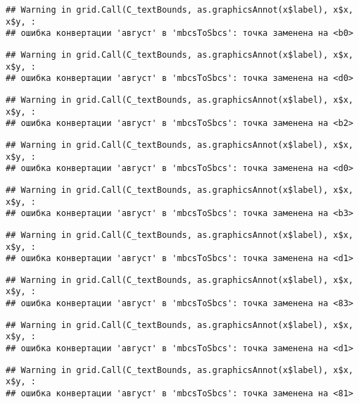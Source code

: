 \documentclass[
]{article}
\begin{document}
\begin{verbatim}
## Warning in grid.Call(C_textBounds, as.graphicsAnnot(x$label), x$x, x$y, :
## ошибка конвертации 'август' в 'mbcsToSbcs': точка заменена на <b0>
\end{verbatim}

\begin{verbatim}
## Warning in grid.Call(C_textBounds, as.graphicsAnnot(x$label), x$x, x$y, :
## ошибка конвертации 'август' в 'mbcsToSbcs': точка заменена на <d0>
\end{verbatim}

\begin{verbatim}
## Warning in grid.Call(C_textBounds, as.graphicsAnnot(x$label), x$x, x$y, :
## ошибка конвертации 'август' в 'mbcsToSbcs': точка заменена на <b2>
\end{verbatim}

\begin{verbatim}
## Warning in grid.Call(C_textBounds, as.graphicsAnnot(x$label), x$x, x$y, :
## ошибка конвертации 'август' в 'mbcsToSbcs': точка заменена на <d0>
\end{verbatim}

\begin{verbatim}
## Warning in grid.Call(C_textBounds, as.graphicsAnnot(x$label), x$x, x$y, :
## ошибка конвертации 'август' в 'mbcsToSbcs': точка заменена на <b3>
\end{verbatim}

\begin{verbatim}
## Warning in grid.Call(C_textBounds, as.graphicsAnnot(x$label), x$x, x$y, :
## ошибка конвертации 'август' в 'mbcsToSbcs': точка заменена на <d1>
\end{verbatim}

\begin{verbatim}
## Warning in grid.Call(C_textBounds, as.graphicsAnnot(x$label), x$x, x$y, :
## ошибка конвертации 'август' в 'mbcsToSbcs': точка заменена на <83>
\end{verbatim}

\begin{verbatim}
## Warning in grid.Call(C_textBounds, as.graphicsAnnot(x$label), x$x, x$y, :
## ошибка конвертации 'август' в 'mbcsToSbcs': точка заменена на <d1>
\end{verbatim}

\begin{verbatim}
## Warning in grid.Call(C_textBounds, as.graphicsAnnot(x$label), x$x, x$y, :
## ошибка конвертации 'август' в 'mbcsToSbcs': точка заменена на <81>
\end{verbatim}
\end{document}
